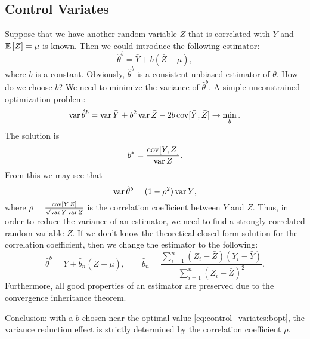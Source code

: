         \subsection{Control Variates}
            Suppose that we have another random variable $Z$ that is correlated with $Y$ and 
            $\mathbb{E}\left[Z\right] = \mu$ is known. Then we could introduce the following estimator:
            \begin{equation}
                \hat\theta^b = \bar Y + b(\bar Z - \mu),
            \end{equation}
            where $b$ is a constant. Obviously, $\hat\theta^b$ is a consistent unbiased estimator of 
            $\theta$. How do we choose $b$? We need to minimize the variance of $\hat\theta^b$. A simple 
            unconstrained optimization problem:
            \begin{equation*}
                \operatorname*{var} \hat\theta^b = \operatorname*{var} \bar Y + b^2 \operatorname*{var} \bar Z - 2b \operatorname*{cov} [\bar Y, \bar Z] \to \min_b.
            \end{equation*}
            The solution is
            \begin{equation}
                b^* = \frac{\operatorname*{cov} [Y, Z]}{\operatorname*{var} Z}.\label{eq:control_variates:bopt}
            \end{equation}
            From this we may see that
            \begin{equation*}
                \operatorname*{var} \hat\theta^b = (1-\rho^2) \operatorname*{var} \bar Y,            
            \end{equation*}
            where $\rho = \frac{\operatorname*{cov} [Y, Z]}{\sqrt{\operatorname*{var} Y \operatorname*{var} Z}}$ is the correlation coefficient between $Y$ and $Z$.
            Thus, in order to reduce the variance of an estimator, we need to find a strongly correlated random variable $Z$.
            If we don't know the theoretical closed-form solution for the correlation coefficient, then we change the estimator to the following:
            \begin{equation*}
                \hat\theta^b = \bar Y + \hat b_n(\bar Z - \mu), \qquad \hat b_n = \frac{\sum_{i=1}^n (Z_i - \bar Z)(Y_i - \bar Y)}{\sum_{i=1}^n (Z_i - \bar Z)^2}.
            \end{equation*}
            Furthermore, all good properties of an estimator are preserved due to the convergence inheritance theorem.

            Conclusion: with a $b$ chosen near the optimal value \eqref{eq:control_variates:bopt}, the variance 
            reduction effect is strictly determined by the correlation coefficient $\rho$.

